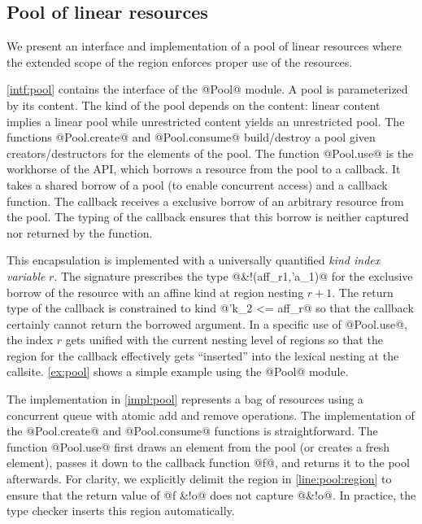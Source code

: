 \subsection{Pool of linear resources}
\label{tuto:pool}

We present an interface and implementation of a pool of linear resources where the
extended scope of the region enforces proper use of the resources.

\cref{intf:pool} contains the interface of the @Pool@ module.
A pool is parameterized by its content. The kind of the pool
depends on the content: linear content implies
a linear pool while unrestricted content yields an unrestricted pool.
The functions @Pool.create@ and @Pool.consume@
build/destroy a pool given creators/destructors for the elements
of the pool.
The function @Pool.use@ is the workhorse of the API, which
borrows a resource from the pool to a callback.
It takes a shared borrow of a pool (to enable concurrent access) and a
callback function.
The callback receives a exclusive borrow of an arbitrary resource from the pool.
The typing of the callback ensures
that this borrow is neither captured nor returned by the function.

This encapsulation is implemented with a universally quantified \emph{kind index variable} $r$.
The signature prescribes the type @&!(aff_r1,'a_1)@ for the
exclusive borrow of the resource with an affine kind at region nesting $r+1$. The return
type of the callback is constrained to kind @'k_2 <= aff_r@
so that the callback certainly cannot return the borrowed argument.
In a specific use of @Pool.use@, the index $r$ gets unified
with the current nesting level of regions so that the region for the
callback effectively gets ``inserted'' into the lexical nesting at the callsite.
%
\cref{ex:pool} shows a simple example using the @Pool@ module.

The implementation in \cref{impl:pool} represents a bag of resources
using a concurrent queue with atomic add and remove operations.
The implementation of the @Pool.create@ and @Pool.consume@
functions is straightforward.
The function @Pool.use@ first draws
an element from the pool (or creates a fresh element),
passes it down to the callback function @f@, and returns
it to the pool afterwards.
For clarity,
we explicitly delimit the region in \cref{line:pool:region} to ensure that
the return value of @f &!o@ does not capture @&!o@.
In practice, the type checker inserts this region automatically.

